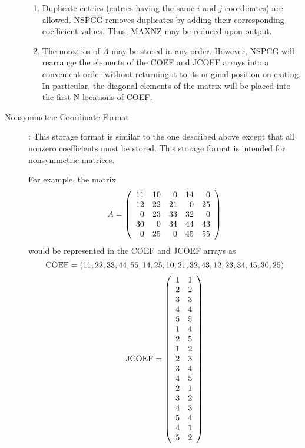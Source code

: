 \begin{description}
\begin{enumerate}
  \item
       Duplicate entries (entries having the same $i$ and $j$
       coordinates) are allowed.  NSPCG removes duplicates by
       adding their corresponding coefficient values.  Thus,
       MAXNZ may be reduced upon output.
 
  \item
       The nonzeros of $A$ may be stored in any order.  However,
       NSPCG will rearrange the elements of the COEF and JCOEF
       arrays into a convenient order without returning
       it to its original position on exiting.  In particular,
       the diagonal elements of the matrix will be placed into
       the first N locations of COEF.
  \end{enumerate}
 
\newpage
\item[Nonsymmetric Coordinate Format]:
  This storage format is similar to the one described above
  except that all nonzero coefficients must be stored.
  This storage format is intended for nonsymmetric matrices.
 
  For example, the matrix
  \[
     A = \left( \begin{array}{rrrrr}
                 11 & 10 &  0 & 14 &  0 \\
                 12 & 22 & 21 &  0 & 25 \\
                  0 & 23 & 33 & 32 &  0 \\
                 30 &  0 & 34 & 44 & 43 \\
                  0 & 25 &  0 & 45 & 55
        \end{array} \right)
  \]
  would be represented in the COEF and JCOEF arrays as
  \[
     \mbox{COEF} = (11,22,33,44,55,14,25,10,21, \\
                    32,43,12,23,34,45,30,25)
  \]
  \[
     \mbox{JCOEF} = \left( \begin{array}{cc}
             1 & 1 \\
             2 & 2 \\
             3 & 3 \\
             4 & 4 \\
             5 & 5 \\
             1 & 4 \\
             2 & 5 \\
             1 & 2 \\
             2 & 3 \\
             3 & 4 \\
             4 & 5 \\
             2 & 1 \\
             3 & 2 \\
             4 & 3 \\
             5 & 4 \\
             4 & 1 \\
             5 & 2
      \end{array} \right)
  \]
 

\end{description}
